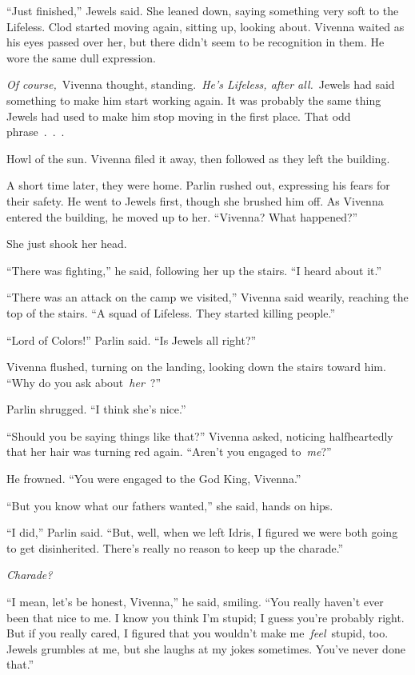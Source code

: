 “Just finished,” Jewels said. She leaned down, saying something very soft to the Lifeless. Clod started moving again, sitting up, looking about. Vivenna waited as his eyes passed over her, but there didn’t seem to be recognition in them. He wore the same dull expression.

\textit{Of course,}~Vivenna thought, standing.~\textit{He’s Lifeless, after all.}~Jewels had said something to make him start working again. It was probably the same thing Jewels had used to make him stop moving in the first place. That odd phrase~.~.~.

Howl of the sun. Vivenna filed it away, then followed as they left the building.

\orn

A short time later, they were home. Parlin rushed out, expressing his fears for their safety. He went to Jewels first, though she brushed him off. As Vivenna entered the building, he moved up to her. “Vivenna? What happened?”

She just shook her head.

“There was fighting,” he said, following her up the stairs. “I heard about it.”

“There was an attack on the camp we visited,” Vivenna said wearily, reaching the top of the stairs. “A squad of Lifeless. They started killing people.”

“Lord of Colors!” Parlin said. “Is Jewels all right?”

Vivenna flushed, turning on the landing, looking down the stairs toward him. “Why do you ask about~\textit{her}~?”

Parlin shrugged. “I think she’s nice.”

“Should you be saying things like that?” Vivenna asked, noticing halfheartedly that her hair was turning red again. “Aren’t you engaged to~\textit{me}?”

He frowned. “You were engaged to the God King, Vivenna.”

“But you know what our fathers wanted,” she said, hands on hips.

“I did,” Parlin said. “But, well, when we left Idris, I figured we were both going to get disinherited. There’s really no reason to keep up the charade.”

\textit{Charade?}

“I mean, let’s be honest, Vivenna,” he said, smiling. “You really haven’t ever been that nice to me. I know you think I’m stupid; I guess you’re probably right. But if you really cared, I figured that you wouldn’t make me~\textit{feel}~stupid, too. Jewels grumbles at me, but she laughs at my jokes sometimes. You’ve never done that.”

